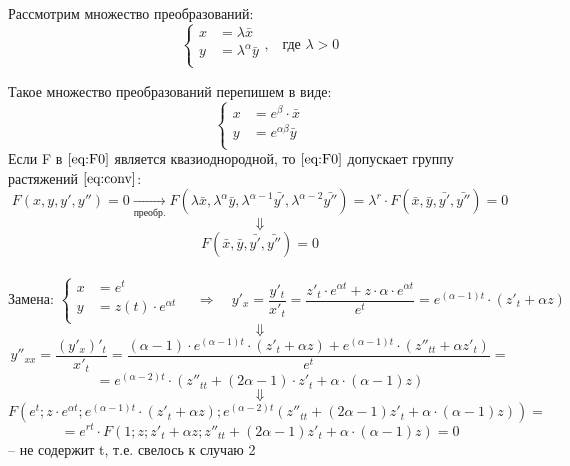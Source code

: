 \begin{corollary}
\begin{enumerate}
			Рассмотрим множество преобразований:
			\begin{equation} \label{eq:conv}
			\left\{
			\begin{aligned} 
			x &= \lambda \bar{x}  \\
			y &= \lambda^{\alpha} \bar{y}\\   
			\end{aligned}
			\right.\text{,}  \quad  \text{где } \lambda > 0                                            
			\end{equation}

		  Такое множество преобразований перепишем в виде: 
		 \[
			\left\{
			\begin{aligned}
				x &= e^{\beta} \cdot \bar{x}  \\
				y &= e^{\alpha \beta} \bar{y} \\   
			\end{aligned}
			\right.                                                          
		\]
		Если F в $\eqref{eq:F0}$ является квазиоднородной, то $\eqref{eq:F0}$ допускает группу растяжений $\eqref{eq:conv}$: \\
		\[
			\boxed{F(x, y, y', y'') = 0} \xrightarrow[\text{преобр.}]{} F(\lambda \bar{x}, \lambda^{\alpha} \bar{y}, \lambda^{\alpha - 1} \bar{y'}, \lambda^{\alpha - 2} \bar{y''}) = \lambda^{r} \cdot F(\bar{x}, \bar{y}, \bar{y'}, \bar{y''}) = 0
		\]
		\[
			\Downarrow
		\]
		\[
		 	F(\bar{x}, \bar{y}, \bar{y'}, \bar{y''}) = 0
		\]
		\ \\
	    \[
		\text{Замена: }\left\{
		\begin{aligned}
			x &= e^{t}  \\
			y &= z(t) \cdot e^{\alpha t}\\   
		\end{aligned}
		\right. \quad
		\Rightarrow  \quad y'_x = \frac{y'_t}{x'_t} = \frac{z'_t \cdot e^{\alpha t} +  z \cdot \alpha \cdot e^{\alpha t}}{e^t} =  e^{(\alpha  -  1)t} \cdot (z'_t  + \alpha z)                                              
		\]
		\[
		  \Downarrow
		\]
		\[
			y''_{xx} = \frac{(y'_x)'_t}{x'_t} = \frac{(\alpha - 1) \cdot e^{(\alpha - 1)t} \cdot (z'_t + \alpha z) + e^{(\alpha - 1)t} \cdot (z''_{tt} + \alpha z'_t)}{e^t} = 
		\]	
		\[	
			= e^{(\alpha - 2)t} \cdot (z''_{tt} + (2\alpha - 1)\cdot z'_t + \alpha \cdot (\alpha - 1)z)
		\]
		\[
		  \Downarrow
		\]
		\[
			F(e^t; z \cdot e^{\alpha t}; e^{(\alpha - 1)t} \cdot (z'_t + \alpha z); e^{(\alpha - 2)t}(z''_{tt} + (2\alpha - 1)z'_t + \alpha \cdot (\alpha - 1)z) ) =
		\]
		\[
			= e^{rt} \cdot F(1; z; z'_t + \alpha z; z''_{tt} + (2\alpha - 1)z'_t + \alpha \cdot (\alpha - 1)z) = 0
		\]
		-- не содержит t, т.е. свелось к случаю 2
	\end{enumerate}
\end{corollary}

